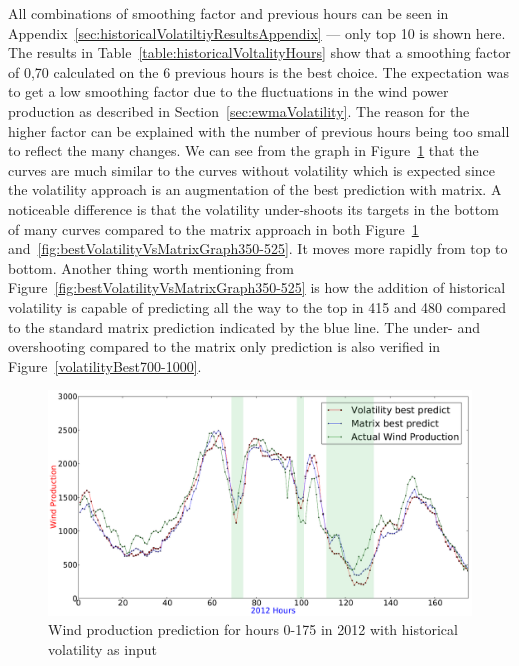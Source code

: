 All combinations of smoothing factor and previous hours can be seen in Appendix~\ref{sec:historicalVolatiltiyResultsAppendix} --- only top 10 is shown here. The results in Table~\ref{table:historicalVoltalityHours} show that a smoothing factor of 0,70 calculated on the 6 previous hours is the best choice. The expectation was to get a low smoothing factor due to the fluctuations in the wind power production as described in Section~\ref{sec:ewmaVolatility}. The reason for the higher factor can be explained with the number of previous hours being too small to reflect the many changes. We can see from the graph in Figure~\ref{fig:bestVolatilityVsMatrixGraph} that the curves are much similar to the curves without volatility which is expected since the volatility approach is an augmentation of the best prediction with matrix. A noticeable difference is that the volatility under-shoots its targets in the bottom of many curves compared to the matrix approach in both Figure~\ref{fig:bestVolatilityVsMatrixGraph} and~\ref{fig:bestVolatilityVsMatrixGraph350-525}. It moves more rapidly from top to bottom. Another thing worth mentioning from Figure~\ref{fig:bestVolatilityVsMatrixGraph350-525} is how the addition of historical volatility is capable of predicting all the way to the top in 415 and 480 compared to the standard matrix prediction indicated by the blue line. The under- and overshooting compared to the matrix only prediction is also verified in Figure~\ref{volatilityBest700-1000}.

\begin{figure}[H]
\centering
\includegraphics[width=0.99\linewidth]{billeder/bestVolatilityVsMatrixGraph.png}
\caption{Wind production prediction for hours 0-175 in 2012 with historical volatility as input}
\label{fig:bestVolatilityVsMatrixGraph}
\end{figure} 

